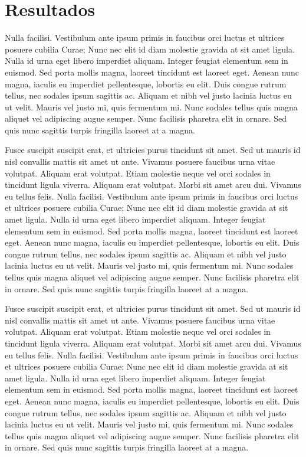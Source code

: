 \documentclass[twocolumn,a4paper,10pt]{article}
\begin{document}
\section{Resultados}
Nulla facilisi. Vestibulum ante ipsum primis in faucibus orci luctus et ultrices posuere cubilia Curae; Nunc nec elit id diam molestie gravida at sit amet ligula. Nulla id urna eget libero imperdiet aliquam. Integer feugiat elementum sem in euismod. Sed porta mollis magna, laoreet tincidunt est laoreet eget. Aenean nunc magna, iaculis eu imperdiet pellentesque, lobortis eu elit. Duis congue rutrum tellus, nec sodales ipsum sagittis ac. Aliquam et nibh vel justo lacinia luctus eu ut velit. Mauris vel justo mi, quis fermentum mi. Nunc sodales tellus quis magna aliquet vel adipiscing augue semper. Nunc facilisis pharetra elit in ornare. Sed quis nunc sagittis turpis fringilla laoreet at a magna.

Fusce suscipit suscipit erat, et ultricies purus tincidunt sit amet. Sed ut mauris id nisl convallis mattis sit amet ut ante. Vivamus posuere faucibus urna vitae volutpat. Aliquam erat volutpat. Etiam molestie neque vel orci sodales in tincidunt ligula viverra. Aliquam erat volutpat. Morbi sit amet arcu dui. Vivamus eu tellus felis.
Nulla facilisi. Vestibulum ante ipsum primis in faucibus orci luctus et ultrices posuere cubilia Curae; Nunc nec elit id diam molestie gravida at sit amet ligula. Nulla id urna eget libero imperdiet aliquam. Integer feugiat elementum sem in euismod. Sed porta mollis magna, laoreet tincidunt est laoreet eget. Aenean nunc magna, iaculis eu imperdiet pellentesque, lobortis eu elit. Duis congue rutrum tellus, nec sodales ipsum sagittis ac. Aliquam et nibh vel justo lacinia luctus eu ut velit. Mauris vel justo mi, quis fermentum mi. Nunc sodales tellus quis magna aliquet vel adipiscing augue semper. Nunc facilisis pharetra elit in ornare. Sed quis nunc sagittis turpis fringilla laoreet at a magna.

Fusce suscipit suscipit erat, et ultricies purus tincidunt sit amet. Sed ut mauris id nisl convallis mattis sit amet ut ante. Vivamus posuere faucibus urna vitae volutpat. Aliquam erat volutpat. Etiam molestie neque vel orci sodales in tincidunt ligula viverra. Aliquam erat volutpat. Morbi sit amet arcu dui. Vivamus eu tellus felis.
Nulla facilisi. Vestibulum ante ipsum primis in faucibus orci luctus et ultrices posuere cubilia Curae; Nunc nec elit id diam molestie gravida at sit amet ligula. Nulla id urna eget libero imperdiet aliquam. Integer feugiat elementum sem in euismod. Sed porta mollis magna, laoreet tincidunt est laoreet eget. Aenean nunc magna, iaculis eu imperdiet pellentesque, lobortis eu elit. Duis congue rutrum tellus, nec sodales ipsum sagittis ac. Aliquam et nibh vel justo lacinia luctus eu ut velit. Mauris vel justo mi, quis fermentum mi. Nunc sodales tellus quis magna aliquet vel adipiscing augue semper. Nunc facilisis pharetra elit in ornare. Sed quis nunc sagittis turpis fringilla laoreet at a magna.
\end{document}
